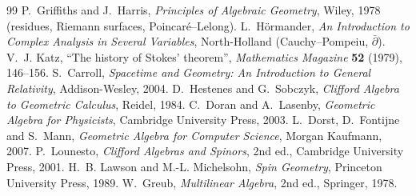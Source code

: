 \documentclass[11pt,a4paper]{article}
\numberwithin{equation}{section}
\theoremstyle{definition}
\theoremstyle{plain}
\begin{document}
\begin{thebibliography}{99}
 P.~Griffiths and J.~Harris, \emph{Principles of Algebraic Geometry}, Wiley, 1978 (residues, Riemann surfaces, Poincar\'e--Lelong).
 L.~H\"ormander, \emph{An Introduction to Complex Analysis in Several Variables}, North-Holland (Cauchy--Pompeiu, $\bar\partial$).
 V.~J. Katz, ``The history of Stokes' theorem'', \emph{Mathematics Magazine} \textbf{52} (1979), 146--156.
 S.~Carroll, \emph{Spacetime and Geometry: An Introduction to General Relativity}, Addison-Wesley, 2004.
 D.~Hestenes and G.~Sobczyk, \emph{Clifford Algebra to Geometric Calculus}, Reidel, 1984.
 C.~Doran and A.~Lasenby, \emph{Geometric Algebra for Physicists}, Cambridge University Press, 2003.
 L.~Dorst, D.~Fontijne and S.~Mann, \emph{Geometric Algebra for Computer Science}, Morgan Kaufmann, 2007.
 P.~Lounesto, \emph{Clifford Algebras and Spinors}, 2nd ed., Cambridge University Press, 2001.
 H.~B. Lawson and M.-L. Michelsohn, \emph{Spin Geometry}, Princeton University Press, 1989.
 W.~Greub, \emph{Multilinear Algebra}, 2nd ed., Springer, 1978.
\end{thebibliography}
\end{document}
